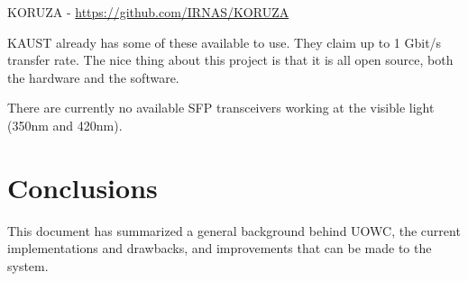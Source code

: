 \documentclass{article}
\begin{document}
KORUZA - \url{https://github.com/IRNAS/KORUZA}

KAUST already has some of these available to use. They claim up to 1 Gbit/s transfer rate. The nice thing about this project is that it is all open source, both the hardware and the software.

There are currently no available \ac{SFP} transceivers working at the visible light (350nm and 420nm).

\section{Conclusions}
This document has summarized a general background behind \ac{UOWC}, the current implementations and drawbacks, and improvements that can be made to the system.





\end{document}
